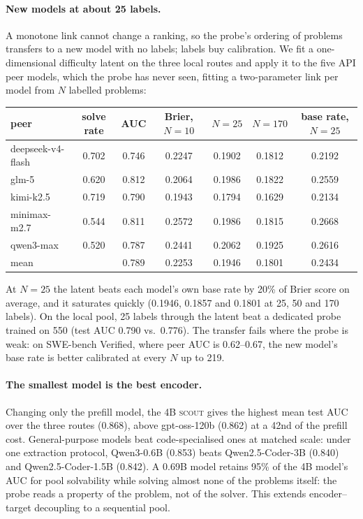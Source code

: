 \documentclass[10pt]{article} %
\newcommand{\scout}{\textsc{scout}\xspace}
\begin{document}
\paragraph{New models at about 25 labels.}
A monotone link cannot change a ranking, so the probe's ordering of problems transfers to a new
model with no labels; labels buy calibration.  We fit a one-dimensional difficulty latent on the
three local routes and apply it to the five API peer models, which the probe has never seen,
fitting a two-parameter link per model from $N$ labelled problems:
\begin{center}
\small
\begin{tabular}{lcccccc}
\toprule
peer & solve rate & AUC & Brier, $N{=}10$ & $N{=}25$ & $N{=}170$ & base rate, $N{=}25$ \\
\midrule
deepseek-v4-flash & 0.702 & 0.746 & 0.2247 & 0.1902 & 0.1812 & 0.2192 \\
glm-5 & 0.620 & 0.812 & 0.2064 & 0.1986 & 0.1822 & 0.2559 \\
kimi-k2.5 & 0.719 & 0.790 & 0.1943 & 0.1794 & 0.1629 & 0.2134 \\
minimax-m2.7 & 0.544 & 0.811 & 0.2572 & 0.1986 & 0.1815 & 0.2668 \\
qwen3-max & 0.520 & 0.787 & 0.2441 & 0.2062 & 0.1925 & 0.2616 \\
\midrule
mean & & 0.789 & 0.2253 & 0.1946 & 0.1801 & 0.2434 \\
\bottomrule
\end{tabular}
\end{center}
At $N=25$ the latent beats each model's own base rate by 20\% of Brier score on average, and it
saturates quickly (0.1946, 0.1857 and 0.1801 at 25, 50 and 170 labels).  On the local pool, 25
labels through the latent beat a dedicated probe trained on 550 (test AUC 0.790 vs.\ 0.776).  The
transfer fails where the probe is weak: on SWE-bench Verified, where peer AUC is 0.62--0.67, the
new model's base rate is better calibrated at every $N$ up to 219.

\paragraph{The smallest model is the best encoder.}
Changing only the prefill model, the 4B \scout gives the highest mean test AUC over the three
routes (0.868), above gpt-oss-120b (0.862) at a 42nd of the prefill cost.  General-purpose models
beat code-specialised ones at matched scale: under one extraction protocol, Qwen3-0.6B (0.853)
beats Qwen2.5-Coder-3B (0.840) and Qwen2.5-Coder-1.5B (0.842).  A 0.69B model retains 95\% of the
4B model's AUC for pool solvability while solving almost none of the problems itself: the probe
reads a property of the problem, not of the solver.  This extends encoder--target decoupling
\citep{prefillrouter2026} to a sequential pool.
\end{document}
